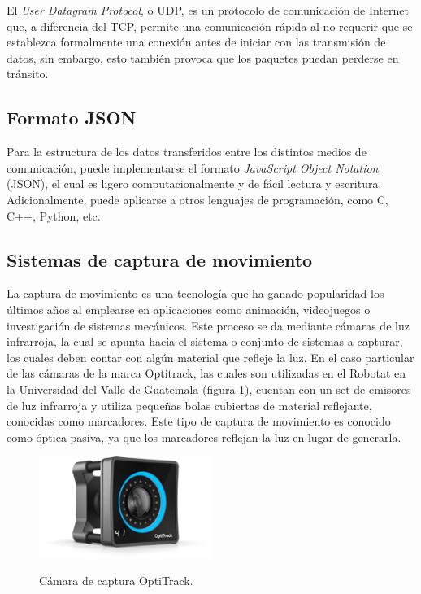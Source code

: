 El \emph{User Datagram Protocol}, o UDP, es un protocolo de comunicación de Internet que, a diferencia del TCP, permite una comunicación rápida al no requerir que se establezca formalmente una conexión antes de iniciar con las transmisión de datos, sin embargo, esto también provoca que los paquetes puedan perderse en tránsito. \cite{UDP}

\subsection*{Formato JSON}
Para la estructura de los datos transferidos entre los distintos medios de comunicación, puede implementarse el formato \emph{JavaScript Object Notation} (JSON), el cual es ligero computacionalmente y de fácil lectura y escritura. Adicionalmente, puede aplicarse a otros lenguajes de programación, como C, C++, Python, etc.

\subsection*{Sistemas de captura de movimiento}

La captura de movimiento es una tecnología que ha ganado popularidad los últimos años al emplearse en aplicaciones como animación, videojuegos o investigación de sistemas mecánicos. Este proceso se da mediante cámaras de luz infrarroja, la cual se apunta hacia el sistema o conjunto de sistemas a capturar, los cuales deben contar con algún material que refleje la luz. En el caso particular de las cámaras de la marca Optitrack, las cuales son utilizadas en el Robotat en la Universidad del Valle de Guatemala (figura \ref{fig:camara}), cuentan con un set de emisores de luz infrarroja y utiliza pequeñas bolas cubiertas de material reflejante, conocidas como marcadores. Este tipo de captura de movimiento es conocido como óptica pasiva, ya que los marcadores reflejan la luz en lugar de generarla. \cite{Camilo2022_tesis}

\begin{figure}[t]
    \centering
    \includegraphics[width=0.5\textwidth]{figuras/primeX41-perspective-235.png}
    \caption{Cámara de captura OptiTrack.}
    \cite{OptiTrack_Primex-40}
    \label{fig:camara}
\end{figure}

